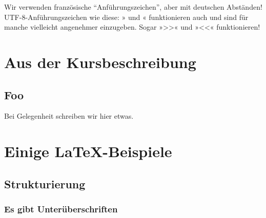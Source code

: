 \documentclass{doku2018}
\begin{document}
\tableofcontents


Wir verwenden französische "`Anführungszeichen"', aber mit deutschen Abständen!
UTF-8-Anführungszeichen wie diese: » und « funktionieren auch und sind für
manche vielleicht angenehmer einzugeben. Sogar »>>« und »<<« funktionieren!

\section{Aus der Kursbeschreibung}

\Blindtext

\subsection{Foo}
\blindtext

Bei Gelegenheit schreiben wir hier etwas.

\section{Einige \LaTeX-Beispiele}

\subsection{Strukturierung}

\subsubsection{Es gibt Unterüberschriften}
\end{document}
